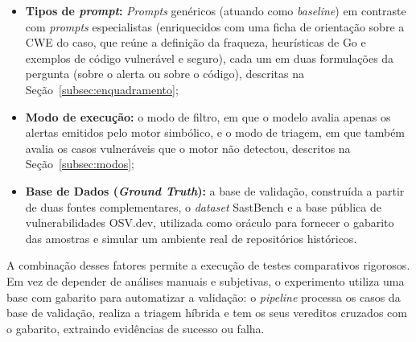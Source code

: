 \begin{itemize}
\begin{itemize}
       \begin{itemize}
           \item sem raciocínio e com temperatura zero, como os locais, duas vezes, porque o fornecedor não oferece semente fixa e é preciso medir quanto o próprio modelo varia. A concordância entre as duas execuções é medida pela fração de casos com o mesmo veredito e pelo $\kappa$ de Cohen \cite{cohen_coefficient_1960}, que desconta a concordância que ocorreria por acaso e vale 1 quando ela é perfeita;
           \item com raciocínio em esforço baixo;
           \item com raciocínio em esforço alto.
       \end{itemize}
       Com o raciocínio ligado, o fornecedor só aceita a temperatura padrão.
   \end{itemize}
    \item \textbf{Tipos de \textit{prompt}:} \textit{Prompts} genéricos (atuando como \textit{baseline}) em contraste com \textit{prompts} especialistas (enriquecidos com uma ficha de orientação sobre a CWE do caso, que reúne a definição da fraqueza, heurísticas de Go e exemplos de código vulnerável e seguro), cada um em duas formulações da pergunta (sobre o alerta ou sobre o código), descritas na Seção~\ref{subsec:enquadramento};
    \item \textbf{Modo de execução:} o modo de filtro, em que o modelo avalia apenas os alertas emitidos pelo motor simbólico, e o modo de triagem, em que também avalia os casos vulneráveis que o motor não detectou, descritos na Seção~\ref{subsec:modos};
    \item \textbf{Base de Dados (\textit{Ground Truth}):} a base de validação, construída a partir de duas fontes complementares, o \textit{dataset} SastBench \cite{feiglin2026sastbench} e a base pública de vulnerabilidades OSV.dev, utilizada como oráculo para fornecer o gabarito das amostras e simular um ambiente real de repositórios históricos.
\end{itemize}













A combinação desses fatores permite a execução de testes comparativos rigorosos. Em vez de depender de análises manuais e subjetivas, o experimento utiliza uma base com gabarito para automatizar a validação: o \textit{pipeline} processa os casos da base de validação, realiza a triagem híbrida e tem os seus vereditos cruzados com o gabarito, extraindo evidências de sucesso ou falha.

